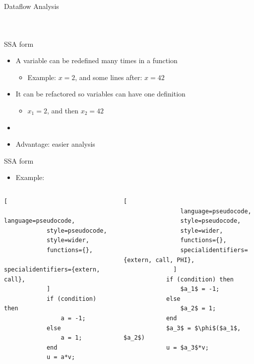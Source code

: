 \begin{frame}[fragile]{Dataflow Analysis}
\begin{columns}[c]
{\begin{tabular}{|c|c|c|c|c|c|c|}
\end{tabular}
} %
\end{columns}

\end{frame}


\begin{frame}{SSA form}
\begin{itemize}
    \item A variable can be redefined many times in a function
    \begin{itemize}
        \item Example: $x = 2$, and some lines after: $x = 42$
    \end{itemize}
    \item It can be refactored so variables can have one definition
    \begin{itemize}
        \item $x_1 = 2$, and then $x_2 = 42$
    \end{itemize}
    \item[]
    \item Advantage: easier analysis
\end{itemize}

\end{frame}


\begin{frame}[fragile]{SSA form}
\begin{itemize}
    \item Example:
\end{itemize}

\begin{columns}[c]
        \begin{lstlisting}[
            language=pseudocode,
            style=pseudocode,
            style=wider,
            functions={},
            specialidentifiers={extern, call},
            ]
            if (condition) then
                a = -1;
            else
                a = 1;
            end
            u = a*v;
        \end{lstlisting}
        \begin{lstlisting}[
                language=pseudocode,
                style=pseudocode,
                style=wider,
                functions={},
                specialidentifiers={extern, call, PHI},
              ]
            if (condition) then
                $a_1$ = -1;
            else
                $a_2$ = 1;
            end
            $a_3$ = $\phi$($a_1$, $a_2$)
            u = $a_3$*v;
        \end{lstlisting}
\end{columns}
\end{frame}

